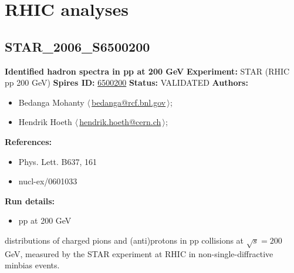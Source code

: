 \clearpage


\section{RHIC analyses}
\subsection[STAR\_2006\_S6500200]{STAR\_2006\_S6500200\,\cite{Adams:2006nd}}
\textbf{Identified hadron spectra in pp at 200 GeV}\newline
\textbf{Experiment:} STAR (RHIC pp 200 GeV) \newline
\textbf{Spires ID:} \href{http://www.slac.stanford.edu/spires/find/hep/www?rawcmd=key+6500200}{6500200}\newline
\textbf{Status:} VALIDATED\newline
\textbf{Authors:}
\begin{itemize}
  \item Bedanga Mohanty $\langle\,$\href{mailto:bedanga@rcf.bnl.gov}{bedanga@rcf.bnl.gov}$\,\rangle$;
  \item Hendrik Hoeth $\langle\,$\href{mailto:hendrik.hoeth@cern.ch}{hendrik.hoeth@cern.ch}$\,\rangle$;
\end{itemize}
\textbf{References:}
\begin{itemize}
  \item Phys. Lett. B637, 161
  \item nucl-ex/0601033
\end{itemize}
\textbf{Run details:}
\begin{itemize}

  \item pp at 200 GeV\end{itemize}

\noindent \pT distributions of charged pions and (anti)protons in pp collisions  at $\sqrt{s} = 200$ GeV, measured by the STAR experiment at RHIC in non-single-diffractive minbias events.

\clearpage


\clearpage

